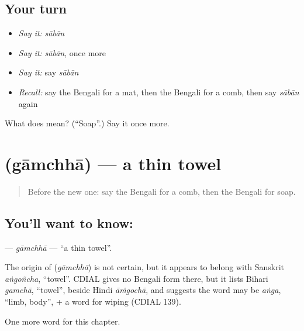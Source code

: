 \subsection*{Your turn}
\begin{itemize}
\raggedright
  \item \emph{Say it:} \emph{sābān}
  \item \emph{Say it:} \emph{sābān}, once more
  \item \emph{Say it:} say \emph{sābān}
  \item \emph{Recall:} say the Bengali for a mat, then the Bengali for a comb, then say \emph{sābān} again
\end{itemize}

\begin{tcolorbox}[breakable,colback=teal!4,colframe=teal!35!black,title={Before you move on}]
What does  mean? (\textquotedblleft{}Soap\textquotedblright{}.) Say it once more.
\end{tcolorbox}
\section[\texorpdfstring{\bn{গামছা} (gāmchhā)}{গামছা (gāmchhā)}]{ (gāmchhā) — a thin towel}

\label{lesson:BN-C109-gamchha}



\begin{quote}
Before the new one: say the Bengali for a comb, then the Bengali for soap.
\end{quote}

\subsection*{You'll want to know: }
\textbf{} — \emph{gāmchhā} — \textquotedblleft{}a thin towel\textquotedblright{}.

\begin{cousinweb}
The origin of \textbf{} (\emph{gāmchhā}) is not certain, but it appears to belong with Sanskrit \emph{aṅgoñcha}, \textquotedblleft{}towel\textquotedblright{}. CDIAL gives no Bengali form there, but it lists Bihari \emph{gamchā}, \textquotedblleft{}towel\textquotedblright{}, beside Hindi \emph{āṁgochā}, and suggests the word may be \emph{aṅga}, \textquotedblleft{}limb, body\textquotedblright{}, + a word for wiping (CDIAL 139).
\end{cousinweb}

\begin{grammarlens}[title={What you've built}]
One more word for this chapter.
\end{grammarlens}

